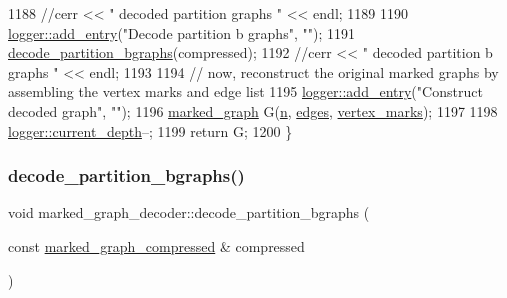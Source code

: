 \begin{DoxyCode}
1188   \textcolor{comment}{//cerr << " decoded partition graphs " << endl;}
1189 
1190   \hyperlink{classlogger_a710163deb17bc81f70d53d285b8ac9ac}{logger::add\_entry}(\textcolor{stringliteral}{"Decode partition b graphs"}, \textcolor{stringliteral}{""});
1191   \hyperlink{classmarked__graph__decoder_aea53529191c7d56a897620b3d842ffaa}{decode\_partition\_bgraphs}(compressed);
1192   \textcolor{comment}{//cerr << " decoded partition b graphs " << endl;}
1193 
1194   \textcolor{comment}{// now, reconstruct the original marked graphs by assembling the vertex marks and edge list}
1195   \hyperlink{classlogger_a710163deb17bc81f70d53d285b8ac9ac}{logger::add\_entry}(\textcolor{stringliteral}{"Construct decoded graph"}, \textcolor{stringliteral}{""});
1196   \hyperlink{classmarked__graph}{marked\_graph} G(\hyperlink{classmarked__graph__decoder_aefc93611bc4a3e9a5d3956d97649a0e9}{n}, \hyperlink{classmarked__graph__decoder_af9e75da0a495d9c3bdcd169e15e3261e}{edges}, \hyperlink{classmarked__graph__decoder_a98be932a5abff7efbc8dd4290268b69a}{vertex\_marks});
1197 
1198   \hyperlink{classlogger_a9d29b49bd318a719a8e85b59eac54fe0}{logger::current\_depth}--;
1199   \textcolor{keywordflow}{return} G;
1200 \}
\end{DoxyCode}
\mbox{\label{classmarked__graph__decoder_aea53529191c7d56a897620b3d842ffaa}} 
\subsubsection{\texorpdfstring{decode\+\_\+partition\+\_\+bgraphs()}{decode\_partition\_bgraphs()}}
{\footnotesize\ttfamily void marked\+\_\+graph\+\_\+decoder\+::decode\+\_\+partition\+\_\+bgraphs (\begin{DoxyParamCaption}\item[{const \hyperlink{classmarked__graph__compressed}{marked\+\_\+graph\+\_\+compressed} \&}]{compressed }\end{DoxyParamCaption})\hspace{0.3cm}{\ttfamily [private]}}


